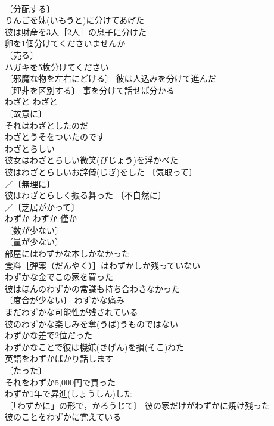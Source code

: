 \documentclass[8pt]{extreport}
\begin{document}
\begin{CJK}{UTF8}{min}
\\	〔分配する〕
\\	りんごを妹(いもうと)に分けてあげた 
\\	彼は財産を3人［2人］の息子に分けた 
\\	卵を1個分けてくださいませんか 
\\	〔売る〕
\\	ハガキを5枚分けてください 
\\	〔邪魔な物を左右にどける〕 彼は人込みを分けて進んだ 
\\	〔理非を区別する〕 事を分けて話せば分かる 
\\	わざと	わざと	
\\	〔故意に〕
\\	それはわざとしたのだ 
\\	わざとうそをついたのです 
\\	わざとらしい　
\\	彼女はわざとらしい微笑(びじょう)を浮かべた 
\\	彼はわざとらしいお辞儀(じぎ)をした 〔気取って〕
\\	／〔無理に〕
\\	彼はわざとらしく振る舞った 〔不自然に〕
\\	／〔芝居がかって〕
\\	わずか	わずか	僅か 
\\	〔数が少ない〕
\\	〔量が少ない〕
\\	部屋にはわずかな本しかなかった 
\\	食料［弾薬（だんやく）］はわずかしか残っていない 
\\	わずかな金でこの家を買った 
\\	彼はほんのわずかの常識も持ち合わさなかった 
\\	〔度合が少ない〕 わずかな痛み 
\\	まだわずかな可能性が残されている 
\\	彼のわずかな楽しみを奪(うば)うものではない 
\\	わずかな差で2位だった 
\\	わずかなことで彼は機嫌(きげん)を損(そこ)ねた 
\\	英語をわずかばかり話します 
\\	〔たった〕　
\\	それをわずか5,000円で買った 
\\	わずか1年で昇進(しょうしん)した 
\\	〔「わずかに」の形で，かろうじて〕 彼の家だけがわずかに焼け残った 
\\	彼のことをわずかに覚えている 

\end{CJK}
\end{document}
